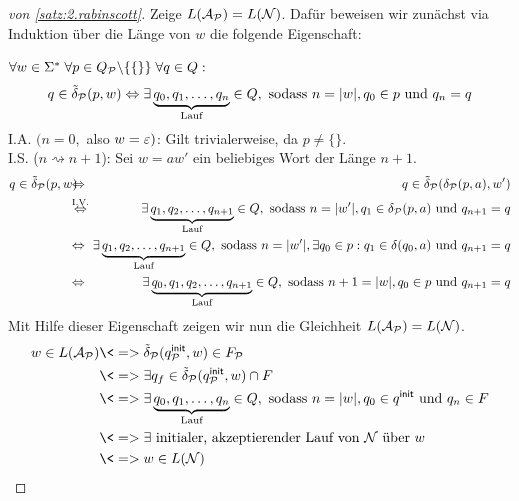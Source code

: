 \begin{proof}[von \autoref{satz:2.rabinscott}]
        Zeige $L(\mathcal{A}_{\mathcal{P}})=L(\mathcal{N})$. 
        Dafür beweisen wir zunächst via Induktion über die Länge von $w$ die folgende Eigenschaft:
        
        $\forall w\in\Sigma^*\; \forall p\in Q_{\mathcal{P}}\backslash\{\{\}\}\; \forall q\in Q:$
        $$q\in\tilde\delta_{\mathcal{P}}(p,w) \Leftrightarrow \exists \underbrace{q_0, q_1,\ldots, q_n}_{\text{Lauf}}\in Q, \text{ sodass }  n=|w|, q_0\in p \text{ und } q_n=q$$
        I.A. $(n=0,$ also $w=\varepsilon)$: Gilt trivialerweise, da $p\neq\{\}$.\\
        I.S. ($n\rightsquigarrow n+1$): Sei $w=aw'$ ein beliebiges Wort der Länge $n+1$.
        \begin{eqnarray*}
                q\in\tilde\delta_\calP(p,w) 
                \hspace*{-2.5mm} & \Leftrightarrow & \hspace*{-2.5mm} q\in\tilde\delta_\calP(\delta_\calP(p,a),w')\\
                & \stackrel{\text{I.V.}}{\Leftrightarrow} & \hspace*{-2.5mm} \exists\underbrace{q_1,q_2,\ldots, q_{n+1}}_{\text{Lauf}}\in Q, \text{ sodass }  n=|w'|, q_1\in \delta_\calP(p,a) \text{ und } q_{n+1}=q\\
                & \Leftrightarrow & \hspace*{-2.5mm}\exists\underbrace{q_1,q_2,\ldots, q_{n+1}}_{\text{Lauf}}\in Q, \text{ sodass }  n=|w'|, \exists q_0\in p: q_1\in\delta(q_0,a) \text{ und } q_{n+1}=q\\
                & \Leftrightarrow & \hspace*{-2.5mm} \exists\underbrace{q_0,q_1,q_2,\ldots, q_{n+1}}_{\text{Lauf}}\in Q,\text{ sodass }  n+1=|w|, q_0\in p \text{ und } q_{n+1}=q
        \end{eqnarray*}
        Mit Hilfe dieser Eigenschaft zeigen wir nun die Gleichheit $L(\mathcal{A}_{\mathcal{P}})=L(\mathcal{N})$.
        \begin{align*}
         w\in L(\A_\calP) 
         &\<=> \tilde\delta_\calP(\qinit_\calP,w)\in F_\calP\\
         &\<=> \exists q_f\in \tilde\delta_\calP(\qinit_\calP,w)\cap F\\
         &\<=> \exists \underbrace{q_0, q_1,\ldots, q_n}_{\text{Lauf}}\in Q, \text{ sodass }  n=|w|, q_0\in \qinit \text{ und } q_n\in F\\
         &\<=> \exists \text{ initialer, akzeptierender Lauf von $\calN$ über $w$} \\
         &\<=> w\in L(\calN)
         \qedhere
        \end{align*}
\end{proof}

